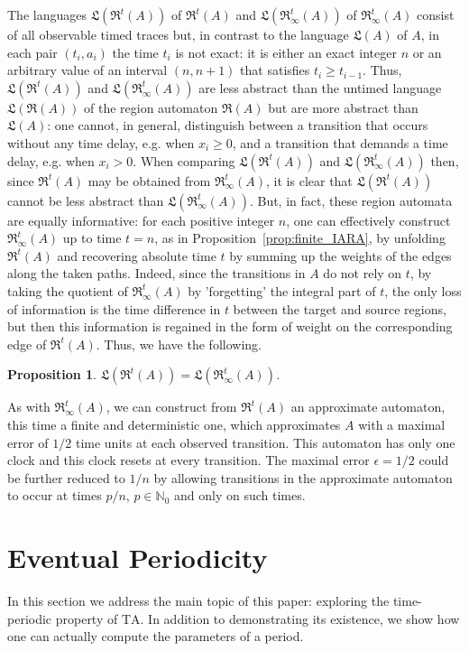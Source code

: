 \documentclass[11pt]{amsart}
\newtheorem{proposition}[theorem]{Proposition}
\theoremstyle{definition}
\newcommand{\LLL}{\mathfrak{L}}
\newcommand{\RRR}{\mathfrak{R}}
\newcommand{\ARRR}{\mathfrak{R}^t}
\newcommand{\IARRR}{\mathfrak{R}_{\infty}^{t}}
\newcommand{\ta}{\mathrm{TA}}
\newcommand{\ZNaturals}{\mathbb{N}_0}
\begin{document}
	The languages $\LLL({\ARRR(A)})$ of $\ARRR(A)$ and $\LLL({\IARRR(A)})$ of $\IARRR(A)$  consist of all observable timed traces but, in contrast to the language $\LLL({A})$ of $A$, in each pair $(t_i,a_i)$ the time $t_i$ is not exact: it is either an exact integer $n$ or an arbitrary value of an interval $(n,n+1)$ that satisfies $t_i \geq t_{i-1}$.
	Thus, $\LLL({\ARRR(A)})$ and  $\LLL({\IARRR(A)})$ are less abstract than the untimed language $\LLL(\RRR(A))$ of the region automaton $\RRR(A)$ but are more abstract than $\LLL({A})$: one cannot, in general, distinguish between a transition that occurs without any time delay, e.g. when $x_i \geq 0$, and a transition that demands a time delay, e.g. when $x_i > 0$.
	When comparing $\LLL({\ARRR(A)})$ and $\LLL({\IARRR(A)})$ then, since $\ARRR(A)$ may be obtained from $\IARRR(A)$, it is clear that $\LLL({\ARRR(A)})$ cannot be less abstract than $\LLL({\IARRR(A)})$.	  
But, in fact, these region automata are equally informative: for each positive integer $n$, one can effectively construct $\IARRR(A)$ up to time $t=n$, as in Proposition~\ref{prop:finite_IARA}, by unfolding $\ARRR(A)$ and recovering absolute time $t$ by summing up the weights of the edges along the taken paths.
	Indeed, since the transitions in $A$ do not rely on $t$, by taking the quotient of $\IARRR(A)$ by 'forgetting' the integral part of $t$, the only loss of information is the time difference in $t$ between the target and source regions, but then this information is regained in the form of weight on the corresponding edge of $\ARRR(A)$.
	Thus, we have the following.
\begin{proposition}
	\label{prop:eq_info}
	 $\LLL({\ARRR(A)}) = \LLL({\IARRR(A)})$.
\end{proposition}

As with $\IARRR(A)$, we can construct from $\ARRR(A)$ an approximate automaton, this time a finite and deterministic one, which approximates $A$ with a maximal error of $1/2$ time units at each observed transition.
This automaton has only one clock and this clock resets at every transition.
The maximal error $\epsilon = 1/2$ could be further reduced to $1/n$ by allowing transitions in the approximate automaton to occur at times $p/n$, $p \in \ZNaturals$ and only on such times.

\section{Eventual Periodicity}
\label{sec:per}
In this section we address the main topic of this paper: exploring the time-periodic property of $\ta$.
In addition to demonstrating its existence, we show how one can actually compute the parameters of a period.
\end{document}
